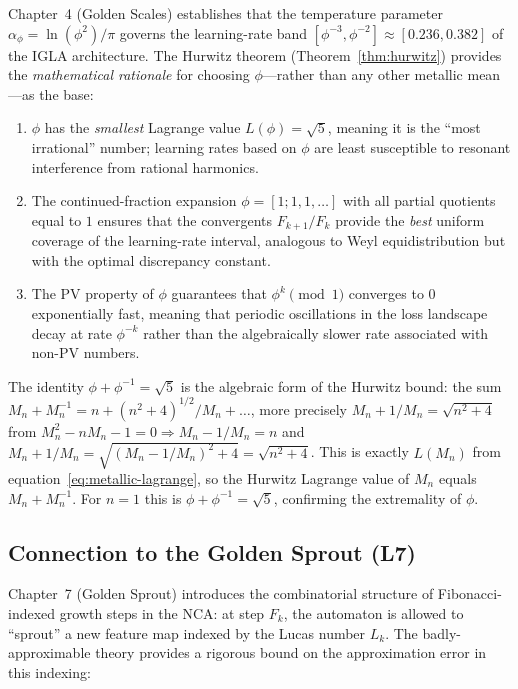 Chapter~4 (Golden Scales) establishes that the
temperature parameter $\alpha_\phi = \ln(\phi^2)/\pi$
governs the learning-rate band
$[\phi^{-3}, \phi^{-2}] \approx [0.236, 0.382]$
of the IGLA architecture.  The Hurwitz theorem
(Theorem~\ref{thm:hurwitz}) provides the
\emph{mathematical rationale} for choosing
$\phi$---rather than any other metallic mean---as
the base:
\begin{enumerate}
  \item $\phi$ has the \emph{smallest} Lagrange
        value $L(\phi) = \sqrt{5}$, meaning it is
        the ``most irrational'' number; learning
        rates based on $\phi$ are least susceptible
        to resonant interference from rational
        harmonics.
  \item The continued-fraction expansion
        $\phi = [1;1,1,\ldots]$ with all partial
        quotients equal to $1$ ensures that the
        convergents $F_{k+1}/F_k$ provide the
        \emph{best} uniform coverage of the
        learning-rate interval, analogous to
        Weyl equidistribution but with the optimal
        discrepancy constant.
  \item The PV property of $\phi$ guarantees that
        $\phi^k \pmod{1}$ converges to $0$
        exponentially fast, meaning that periodic
        oscillations in the loss landscape decay
        at rate $\phi^{-k}$ rather than the
        algebraically slower rate associated with
        non-PV numbers.
\end{enumerate}

The identity $\phi + \phi^{-1} = \sqrt{5}$ is the
algebraic form of the Hurwitz bound: the sum
$M_n + M_n^{-1} = n + (n^2+4)^{1/2}/M_n + \ldots$,
more precisely $M_n + 1/M_n = \sqrt{n^2+4}$ from
$M_n^2 - n M_n - 1 = 0 \Rightarrow M_n - 1/M_n = n$
and $M_n + 1/M_n = \sqrt{(M_n-1/M_n)^2+4} = \sqrt{n^2+4}$.
This is exactly $L(M_n)$ from
equation~\eqref{eq:metallic-lagrange},
so the Hurwitz Lagrange value of $M_n$ equals
$M_n + M_n^{-1}$.  For $n=1$ this is
$\phi + \phi^{-1} = \sqrt{5}$, confirming the
extremality of $\phi$.

\subsection{Connection to the Golden Sprout (L7)}
\label{subsec:link-l7}

Chapter~7 (Golden Sprout) introduces the
combinatorial structure of Fibonacci-indexed
growth steps in the NCA: at step $F_k$, the
automaton is allowed to ``sprout'' a new feature
map indexed by the Lucas number $L_k$.  The
badly-approximable theory provides a rigorous
bound on the approximation error in this indexing:

